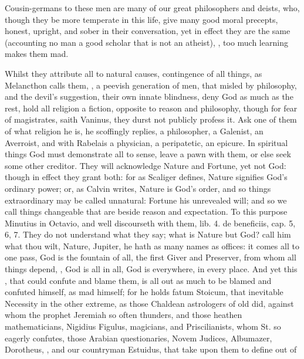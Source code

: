 {Cousin-germans to these men are many of our great philosophers and
deists, who, though they be more temperate in this life, give many good
moral precepts, honest, upright, and sober in their conversation, yet
in effect they are the same (accounting no man a good scholar that is
not an atheist), , too much learning makes them mad.

Whilst they attribute all to natural causes, contingence of all
things, as Melancthon calls them, , a peevish
generation of men, that misled by philosophy, and the devil's
suggestion, their own innate blindness, deny God as much as the rest,
hold all religion a fiction, opposite to reason and philosophy, though
for fear of magistrates, saith Vaninus, they durst not publicly
profess it. Ask one of them of what religion he is, he scoffingly
replies, a philosopher, a Galenist, an Averroist, and with
Rabelais a physician, a peripatetic, an epicure. In spiritual things
God must demonstrate all to sense, leave a pawn with them, or else seek
some other creditor. They will acknowledge Nature and Fortune, yet not
God: though in effect they grant both: for as Scaliger defines, Nature
signifies God's ordinary power; or, as Calvin writes, Nature is God's
order, and so things extraordinary may be called unnatural: Fortune his
unrevealed will; and so we call things changeable that are beside
reason and expectation. To this purpose Minutius in Octavio, and
 \Seneca well discourseth with them, lib. 4. de beneficiis, cap.
5, 6, 7. They do not understand what they say; what is Nature but God?
call him what thou wilt, Nature, Jupiter, he hath as many names as
offices: it comes all to one pass, God is the fountain of all, the
first Giver and Preserver, from whom all things depend, , God is
all in all, God is everywhere, in every place. And yet this \Seneca,
that could confute and blame them, is all out as much to be blamed and
confuted himself, as mad himself; for he holds fatum Stoicum, that
inevitable Necessity in the other extreme, as those Chaldean
astrologers of old did, against whom the prophet Jeremiah so often
thunders, and those heathen mathematicians, Nigidius Figulus,
magicians, and Priscilianists, whom St. \Austin{} so eagerly confutes,
those Arabian questionaries, Novem Judices, Albumazer, Dorotheus, \etc{},
and our countryman Estuidus, that take upon them to define out of
}
